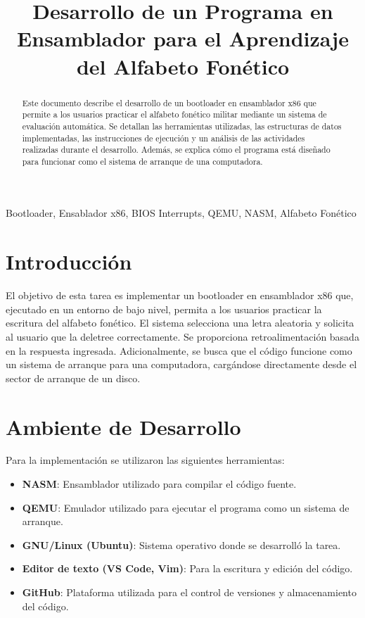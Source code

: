 \documentclass[conference]{IEEEtran}
\begin{document}
\title{Desarrollo de un Programa en Ensamblador para el Aprendizaje del Alfabeto Fonético}

\author{
}

\maketitle

\begin{abstract}
Este documento describe el desarrollo de un bootloader en ensamblador x86 que permite a los usuarios practicar el alfabeto fonético militar mediante un sistema de evaluación automática. Se detallan las herramientas utilizadas, las estructuras de datos implementadas, las instrucciones de ejecución y un análisis de las actividades realizadas durante el desarrollo. Además, se explica cómo el programa está diseñado para funcionar como el sistema de arranque de una computadora.
\end{abstract}

\begin{IEEEkeywords}
Bootloader, Ensablador x86, BIOS Interrupts, QEMU, NASM, Alfabeto Fonético
\end{IEEEkeywords}

\section{Introducción}
El objetivo de esta tarea es implementar un bootloader en ensamblador x86 que, ejecutado en un entorno de bajo nivel, permita a los usuarios practicar la escritura del alfabeto fonético. El sistema selecciona una letra aleatoria y solicita al usuario que la deletree correctamente. Se proporciona retroalimentación basada en la respuesta ingresada. Adicionalmente, se busca que el código funcione como un sistema de arranque para una computadora, cargándose directamente desde el sector de arranque de un disco.

\section{Ambiente de Desarrollo}
Para la implementación se utilizaron las siguientes herramientas:
\begin{itemize}
    \item \textbf{NASM}: Ensamblador utilizado para compilar el código fuente.
    \item \textbf{QEMU}: Emulador utilizado para ejecutar el programa como un sistema de arranque.
    \item \textbf{GNU/Linux (Ubuntu)}: Sistema operativo donde se desarrolló la tarea.
    \item \textbf{Editor de texto (VS Code, Vim)}: Para la escritura y edición del código.
    \item \textbf{GitHub}: Plataforma utilizada para el control de versiones y almacenamiento del código.
\end{itemize}
\end{document}
